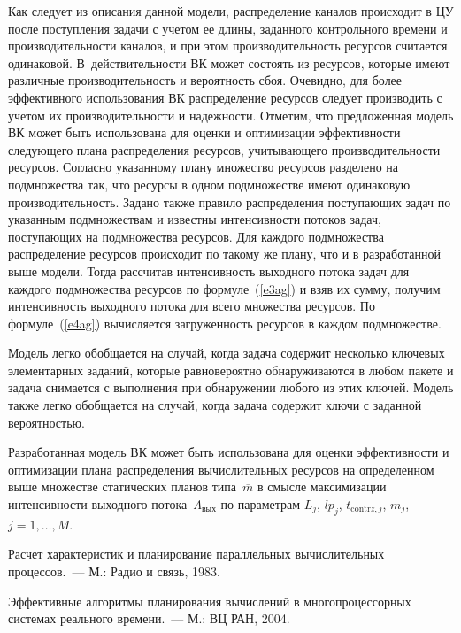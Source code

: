\begin{multicols}{2}
   Как следует из описания данной модели, распределение каналов происходит 
в ЦУ после поступления задачи с учетом ее длины, заданного контрольного 
времени и производительности каналов, и при этом производительность 
ресурсов считается одинаковой. В~действительности ВК может состоять из 
ресурсов, которые имеют различные производительность и вероятность сбоя. 
Очевидно, для более эффективного использования ВК распределение ресурсов 
следует производить с учетом их производительности и надежности. Отметим, 
что предложенная модель ВК может быть использована для оценки и 
оптимизации эффективности следующего плана распределения ресурсов, 
учитывающего производительности ресурсов.
Согласно указанному плану 
множество ресурсов разделено на подмножества так, что ресурсы в одном 
подмножестве имеют одинаковую производительность. Задано также правило 
распределения поступающих задач по указанным подмножествам и известны 
интенсивности потоков задач, поступающих на подмножества ресурсов. Для 
каждого подмножества распределение ресурсов происходит по такому же 
плану, что и в разработанной выше модели. Тогда рассчитав интенсивность 
выходного потока задач для каждого подмножества ресурсов по 
формуле~(\ref{e3ag}) и взяв их сумму, получим интенсивность выходного 
потока для всего множества ресурсов. По формуле~(\ref{e4ag}) вычисляется 
загруженность ресурсов в каждом подмножестве.
   
   Модель легко обобщается на случай, когда задача содержит несколько 
ключевых элементарных заданий, которые равновероятно обнаруживаются в 
любом пакете и задача снимается с выполнения при обнаружении любого из 
этих ключей. Модель также легко обобщается на случай, когда задача содержит 
ключи с заданной вероятностью.
   
   Разработанная модель ВК может быть использована для оценки 
эффективности и оптимизации плана распределения вычислительных ресурсов 
на определенном выше множестве статических планов типа~$\overline{m}$ в 
смысле максимизации интенсивности выходного 
потока~$\Lambda_{\mathrm{вых}}$ по параметрам $L_j$, $lp_j$, $t_{\mathrm{contr}z,j}$, 
$m_j$, $j=1, \ldots ,M$.

{\small\frenchspacing
{%
\begin{thebibliography}{99}


Расчет характеристик и планирование параллельных вычислительных 
процессов.~--- М.: Радио и связь, 1983.

Эффективные алгоритмы планирования вычислений в многопроцессорных 
сис\-те\-мах реального времени.~--- М.: ВЦ РАН, 2004. 


\end{thebibliography}}}
\end{multicols}
